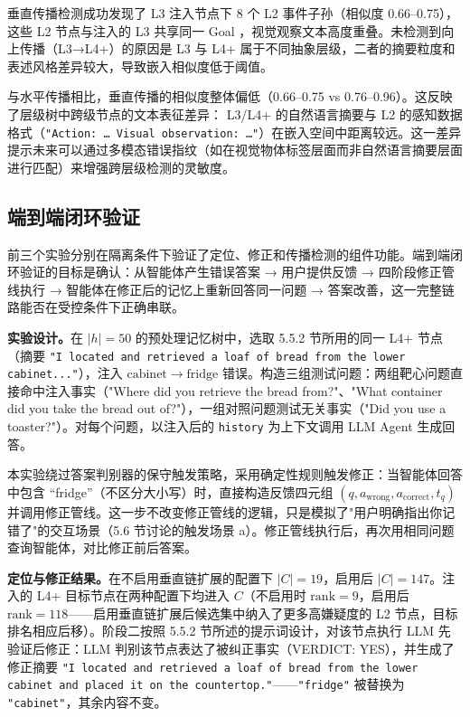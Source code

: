垂直传播检测成功发现了 L3 注入节点下 8 个 L2 事件子孙（相似度 0.66–0.75），这些 L2 节点与注入的 L3 共享同一 Goal ，视觉观察文本高度重叠。未检测到向上传播（L3→L4+）的原因是 L3 与 L4+ 属于不同抽象层级，二者的摘要粒度和表述风格差异较大，导致嵌入相似度低于阈值。

与水平传播相比，垂直传播的相似度整体偏低（0.66–0.75 vs 0.76–0.96）。这反映了层级树中跨级节点的文本表征差异： L3/L4+ 的自然语言摘要与 L2 的感知数据格式（\texttt{"Action: \ldots\ Visual observation: \ldots"}）在嵌入空间中距离较远。这一差异提示未来可以通过多模态错误指纹（如在视觉物体标签层面而非自然语言摘要层面进行匹配）来增强跨层级检测的灵敏度。

\subsection{端到端闭环验证}

前三个实验分别在隔离条件下验证了定位、修正和传播检测的组件功能。端到端闭环验证的目标是确认：从智能体产生错误答案 → 用户提供反馈 → 四阶段修正管线执行 → 智能体在修正后的记忆上重新回答同一问题 → 答案改善，这一完整链路能否在受控条件下正确串联。

\textbf{实验设计。}在 $|h|=50$ 的预处理记忆树中，选取 5.5.2 节所用的同一 L4+ 节点（摘要 \texttt{"I located and retrieved a loaf of bread from the lower cabinet..."}），注入 $\mathrm{cabinet} \rightarrow \mathrm{fridge}$ 错误。构造三组测试问题：两组靶心问题直接命中注入事实（"Where did you retrieve the bread from?"、"What container did you take the bread out of?"），一组对照问题测试无关事实（"Did you use a toaster?"）。对每个问题，以注入后的 \texttt{history} 为上下文调用 LLM Agent 生成回答。

本实验绕过答案判别器的保守触发策略，采用确定性规则触发修正：当智能体回答中包含 “fridge”（不区分大小写）时，直接构造反馈四元组 $(q, a_{\mathrm{wrong}}, a_{\mathrm{correct}}, t_q)$ 并调用修正管线。这一步不改变修正管线的逻辑，只是模拟了"用户明确指出你记错了"的交互场景（5.6 节讨论的触发场景 a）。修正管线执行后，再次用相同问题查询智能体，对比修正前后答案。

\textbf{定位与修正结果。}在不启用垂直链扩展的配置下 $|C|=19$，启用后 $|C|=147$。注入的 L4+ 目标节点在两种配置下均进入 $C$（不启用时 $\mathrm{rank}=9$，启用后 $\mathrm{rank}=118$——启用垂直链扩展后候选集中纳入了更多高嫌疑度的 L2 节点，目标排名相应后移）。阶段二按照 5.5.2 节所述的提示词设计，对该节点执行 LLM 先验证后修正：LLM 判别该节点表达了被纠正事实（VERDICT: YES），并生成了修正摘要 \texttt{"I located and retrieved a loaf of bread from the lower cabinet and placed it on the countertop."}——\texttt{"fridge"} 被替换为 \texttt{"cabinet"}，其余内容不变。

